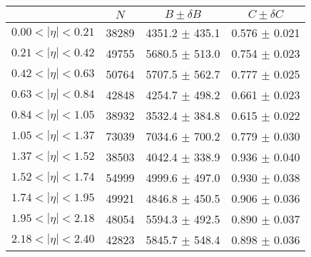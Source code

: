 \begin{tabular}{lccc}
\hline
    &   $N$   & $B \pm \delta B$  &  $C \pm \delta C$ \\
\hline
$0.00 < |\eta| <0.21$          & 38289      & 4351.2     $\pm$ 435.1 & 0.576      $\pm$ 0.021 \\
$0.21 < |\eta| <0.42$          & 49755      & 5680.5     $\pm$ 513.0 & 0.754      $\pm$ 0.023 \\
$0.42 < |\eta| <0.63$          & 50764      & 5707.5     $\pm$ 562.7 & 0.777      $\pm$ 0.025 \\
$0.63 < |\eta| <0.84$          & 42848      & 4254.7     $\pm$ 498.2 & 0.661      $\pm$ 0.023 \\
$0.84 < |\eta| <1.05$          & 38932      & 3532.4     $\pm$ 384.8 & 0.615      $\pm$ 0.022 \\
$1.05 < |\eta| <1.37$          & 73039      & 7034.6     $\pm$ 700.2 & 0.779      $\pm$ 0.030 \\
$1.37 < |\eta| <1.52$          & 38503      & 4042.4     $\pm$ 338.9 & 0.936      $\pm$ 0.040 \\
$1.52 < |\eta| <1.74$          & 54999      & 4999.6     $\pm$ 497.0 & 0.930      $\pm$ 0.038 \\
$1.74 < |\eta| <1.95$          & 49921      & 4846.8     $\pm$ 450.5 & 0.906      $\pm$ 0.036 \\
$1.95 < |\eta| <2.18$          & 48054      & 5594.3     $\pm$ 492.5 & 0.890      $\pm$ 0.037 \\
$2.18 < |\eta| <2.40$          & 42823      & 5845.7     $\pm$ 548.4 & 0.898      $\pm$ 0.036 \\
\hline
\end{tabular}
